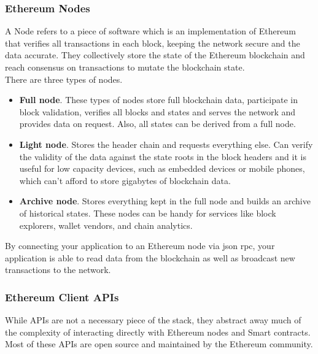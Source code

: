 

\subsubsection{Ethereum Nodes}
A Node refers to a piece of software which is an implementation of Ethereum that verifies all transactions in each block, keeping the network secure and the data accurate. They collectively store the state of the Ethereum blockchain and reach consensus on transactions to mutate the blockchain state.\\

There are three types of nodes.
\begin{itemize}
    \item \textbf{Full node}. These types of nodes store full blockchain data, participate in block validation, verifies all blocks and states and serves the network and provides data on request. Also, all states can be derived from a full node.
    \item \textbf{Light node}. Stores the header chain and requests everything else. Can verify the validity of the data against the state roots in the block headers and it is useful for low capacity devices, such as embedded devices or mobile phones, which can't afford to store gigabytes of blockchain data.
    \item \textbf{Archive node}. Stores everything kept in the full node and builds an archive of historical states. These nodes can be handy for services like block explorers, wallet vendors, and chain analytics.
\end{itemize}
By connecting your application to an Ethereum node via \acrshort{json} \acrshort{rpc}, your application is able to read data from the blockchain as well as broadcast new transactions to the network.

\subsubsection{Ethereum Client APIs}
While APIs are not a necessary piece of the stack, they abstract away much of the complexity of interacting directly with Ethereum nodes and Smart contracts.\\

Most of these APIs are open source and maintained by the Ethereum community.

